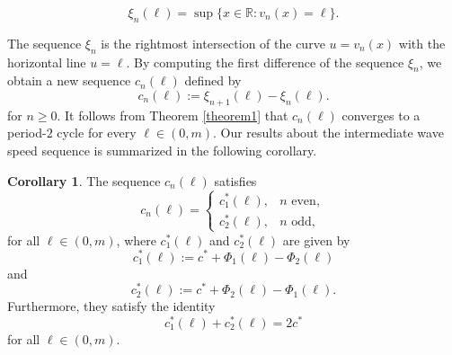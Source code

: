 \documentclass[11pt]{article}
\theoremstyle{definition}
\newtheorem{cor}[thm]{Corollary}
\numberwithin{equation}{section}
\numberwithin{thm}{section}
\newcommand{\m}{m}
\begin{document}
\begin{equation}
 \xi_n(\ell) = \sup \{ x \in \mathbb R : v_n(x) = \ell \}.
\end{equation}

The sequence $\xi_n$ is the rightmost intersection of the curve $u=v_n(x)$ with the horizontal line $u=\ell$. By computing the first difference of the sequence $\xi_n$, we obtain a new sequence $c_n(\ell)$ defined by
\begin{equation}
c_n(\ell) := \xi_{n+1}(\ell) - \xi_n(\ell).
\end{equation}
for $n \geq 0$.  It follows from Theorem \ref{theorem1} that $c_n(\ell)$ converges to a period-$2$ cycle for every $\ell \in (0,\m)$. Our results about the intermediate wave speed sequence is summarized in the following corollary.



\begin{cor}
The sequence $c_n(\ell)$ satisfies
\begin{equation}
c_n(\ell) = \begin{cases}
c_1^*(\ell), & n \text{ even}, \\
c_2^*(\ell), & n \text{ odd},
\end{cases}
\end{equation}
for all $\ell \in (0,\m)$, where $c_1^*(\ell)$ and $c_2^*(\ell)$ are given by
\begin{equation} \label{c1star}
c_1^*(\ell) := c^* + \Phi_1(\ell) - \Phi_2(\ell)
\end{equation}
and
\begin{equation} \label{c2star}
c_2^*(\ell) := c^* + \Phi_2(\ell) - \Phi_1(\ell).
\end{equation}
Furthermore, they satisfy the identity
\begin{equation}
c_1^*(\ell) + c_2^*(\ell) = 2c^*
\end{equation}
for all $\ell \in (0,\m)$.
\end{cor}
\end{document}
